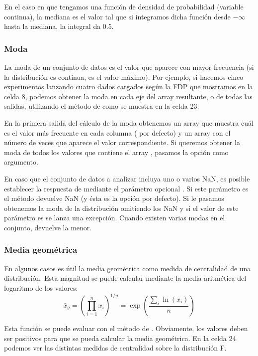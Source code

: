En el caso en que tengamos una función de densidad de probabilidad (variable continua), la mediana es el valor tal que si integramos dicha función desde $-\infty$ hasta la mediana, la integral da $0.5$.


\subsubsection{Moda}
La moda de un conjunto de datos es el valor que aparece con mayor frecuencia (si la distribución es continua, es el valor máximo). Por ejemplo, si hacemos cinco experimentos lanzando cuatro dados cargados según la FDP que mostramos en la celda 8, podemos obtener la moda en cada eje del array resultante, o de todas las salidas, utilizando el método  de  como se muestra en la celda 23:


En la primera salida del cálculo de la moda obtenemos un array que muestra cuál es el valor más frecuente en cada columna ( por defecto) y un array con el número de veces que aparece
el valor correspondiente. Si queremos obtener la moda de todos los valores que contiene el array , pasamos la opción  como argumento. 

En caso que el conjunto de datos a analizar incluya uno o varios NaN, es posible establecer la respuesta de  mediante el parámetro opcional . Si este parámetro es  el método  devuelve NaN (y ésta es la opción por defecto). Si le pasamos  obtenemos la moda de la distribución omitiendo los NaN y si el valor de este parámetro es  se lanza una excepción. Cuando existen varias modas en el conjunto,  devuelve la menor.

\subsubsection{Media geométrica}

En algunos casos es útil la media geométrica como medida de centralidad de una distribución. Esta magnitud se puede calcular mediante la media aritmética del logaritmo de los valores:
\[ \bar{x}_g = \left( \prod_{i=1}^n x_i \right)^{1/n} = \exp \left( \frac{\sum_i \ln(x_i)}{n} \right) \]

Esta función se puede evaluar con el método  de . Obviamente, los valores deben ser positivos para que se pueda calcular la media geométrica. En la celda 24 podemos ver las distintas medidas de centralidad sobre la distribución F.

